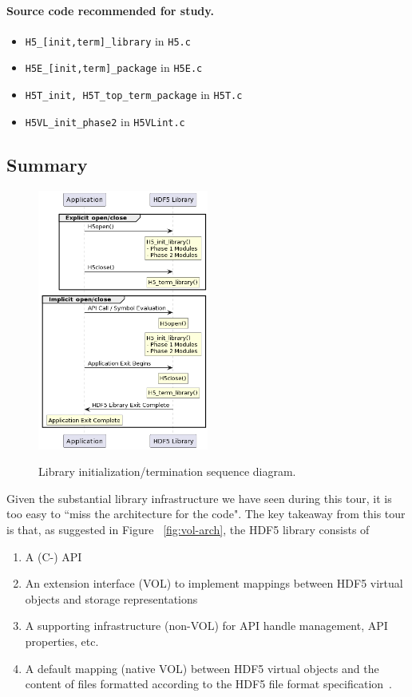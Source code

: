 \paragraph{Source code recommended for study.}

\begin{itemize}
    \item \texttt{H5\_[init,term]\_library} in \texttt{H5.c}
    \item \texttt{H5E\_[init,term]\_package} in \texttt{H5E.c}
    \item \texttt{H5T\_init, H5T\_top\_term\_package} in \texttt{H5T.c}
    \item \texttt{H5VL\_init\_phase2} in \texttt{H5VLint.c}
\end{itemize}

\subsection{Summary}

\begin{figure}[h]
\centering
\includegraphics[width=0.5\textwidth]{images/tour_1_uml.png}
\label{fig:tour-1-uml}
\caption{Library initialization/termination sequence diagram.}
\end{figure}

Given the substantial library infrastructure we have seen during this tour, it is too easy to ``miss the architecture for the code". The key takeaway from this tour is that, as suggested in Figure ~\ref{fig:vol-arch}, the HDF5 library consists of
\begin{enumerate}
    \item A (C-) API
    \item An extension interface (VOL) to implement mappings between HDF5 virtual objects and storage representations
    \item A supporting infrastructure (non-VOL) for API handle management, API properties, etc.
    \item A default mapping (native VOL) between HDF5 virtual objects and the content of files formatted according to the HDF5 file format specification~\cite{ffmt}.
\end{enumerate}


